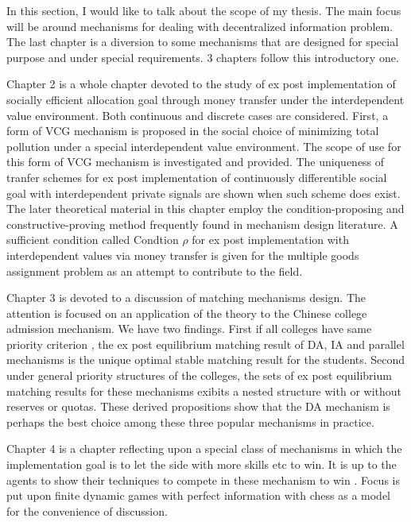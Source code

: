 In this section, I would like to talk about the scope of my
thesis. The main focus will be around mechanisms for dealing with
decentralized information problem. The last chapter is a diversion to
some mechanisms that are designed for special purpose and under special requirements. 3 chapters follow this introductory one.

Chapter 2 is a whole chapter devoted to the study of ex post implementation of socially efficient allocation goal through money transfer under the interdependent value environment. Both continuous and discrete cases are considered. First, a form of VCG mechanism is proposed in the social choice of minimizing total pollution under a special interdependent value environment. The scope of use for this form of VCG mechanism is investigated and provided.  The uniqueness of tranfer schemes for ex post implementation of continuously differentible social goal with interdependent private signals are shown when such scheme does exist. The later theoretical material in this chapter employ the condition-proposing and constructive-proving method frequently found in mechanism design literature.  A sufficient condition called Condtion $\rho$ for ex post implementation with interdependent values via money transfer is given for the multiple goods assignment problem as an attempt to contribute to the field. 

Chapter 3 is devoted to a discussion of matching mechanisms design. The attention is focused on an application of the theory to the Chinese college admission mechanism. We have two findings. First if all colleges have same priority criterion , the ex post equilibrium matching result of DA, IA and parallel mechanisms is the unique optimal stable matching result for the students. Second under general priority structures of the colleges, the sets of ex post equilibrium matching results for these mechanisms exibits a nested structure with or without reserves or quotas. These derived propositions show that the DA mechanism is perhaps the best choice among these three popular mechanisms in practice.

Chapter 4 is a chapter reflecting upon a special class of mechanisms in which the implementation goal is to let the side with more skills etc to win. It is up to the agents to show their techniques to compete in these mechanism to win . Focus is put upon finite dynamic games with perfect information with chess as a model for the convenience of discussion.





